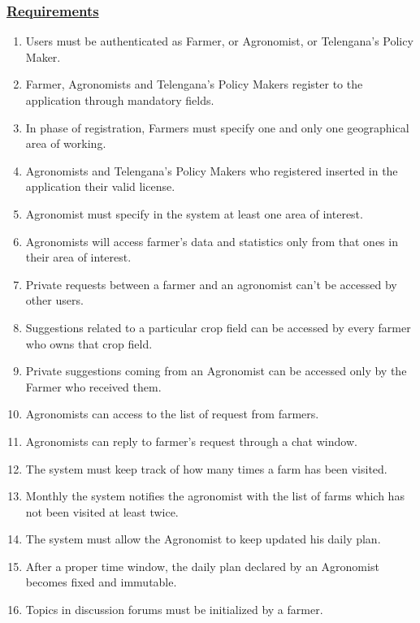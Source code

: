 	\subsubsection[Requirements]{\hyperlink{toc}{Requirements}}
		\begin{enumerate}[label=\textbf{R\arabic*}]
			\item \label{req:R1} Users must be authenticated as Farmer, or Agronomist, or Telengana's Policy Maker.
			\item \label{req:R2} Farmer, Agronomists and Telengana's Policy Makers register  to the application through mandatory fields.
			\item \label{req:R3} In phase of registration, Farmers must specify one and only one geographical area of working.
			\item \label{req:R4} Agronomists and Telengana's Policy Makers who registered inserted in the application their valid license.
			\item \label{req:R5} Agronomist must specify in the system at least one area of interest.
			\item \label{req:R6} Agronomists will access farmer's data and statistics only from that ones in their area of interest.
			\item \label{req:R7} Private requests between a farmer and an agronomist can't be accessed by other users.
			\item \label{req:R8} Suggestions related to a particular crop field can be accessed by every farmer who owns that crop field.
			\item \label{req:R9} Private suggestions coming from an Agronomist can be accessed only by the Farmer who received them.
			\item \label{req:R10} Agronomists can access to the list of request from farmers.
			\item \label{req:R11} Agronomists can reply to farmer's request through a chat window.
			\item \label{req:R12} The system must keep track of how many times a farm has been visited.
			\item \label{req:R13} Monthly the system notifies the agronomist with the list of farms which has not been visited at least twice.
			\item \label{req:R14} The system must allow the Agronomist to keep updated his daily plan.
			\item \label{req:R15} After a proper time window, the daily plan declared by an Agronomist becomes fixed and immutable.
			\item \label{req:R16} Topics in discussion forums must be initialized by a farmer.

\end{enumerate}
